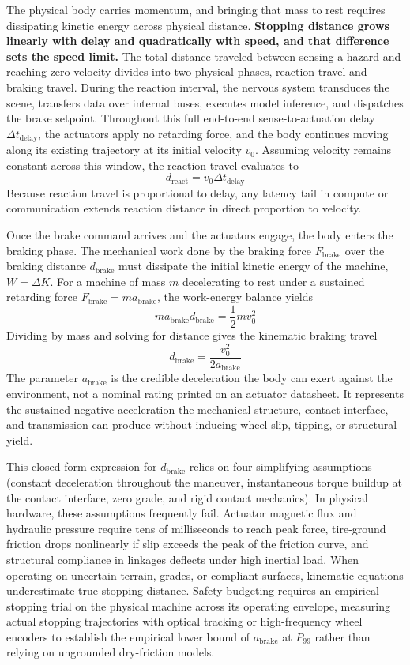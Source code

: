\documentclass[
  letterpaper,
  DIV=11,
  numbers=noendperiod]{scrartcl}
\begin{document}
The physical body carries momentum, and bringing that mass to rest
requires dissipating kinetic energy across physical distance.
\textbf{Stopping distance grows linearly with delay and quadratically
with speed, and that difference sets the speed limit.} The total
distance traveled between sensing a hazard and reaching zero velocity
divides into two physical phases, reaction travel and braking travel.
During the reaction interval, the nervous system transduces the scene,
transfers data over internal buses, executes model inference, and
dispatches the brake setpoint. Throughout this full end-to-end
sense-to-actuation delay \(\Delta t_{\text{delay}}\), the actuators
apply no retarding force, and the body continues moving along its
existing trajectory at its initial velocity \(v_0\). Assuming velocity
remains constant across this window, the reaction travel evaluates to
\[d_{\text{react}} = v_0 \Delta t_{\text{delay}}\] Because reaction
travel is proportional to delay, any latency tail in compute or
communication extends reaction distance in direct proportion to
velocity.

Once the brake command arrives and the actuators engage, the body enters
the braking phase. The mechanical work done by the braking force
\(F_{\text{brake}}\) over the braking distance \(d_{\text{brake}}\) must
dissipate the initial kinetic energy of the machine, \(W = \Delta K\).
For a machine of mass \(m\) decelerating to rest under a sustained
retarding force \(F_{\text{brake}} = m a_{\text{brake}}\), the
work-energy balance yields
\[m a_{\text{brake}} d_{\text{brake}} = \frac{1}{2} m v_0^2\] Dividing
by mass and solving for distance gives the kinematic braking travel
\[d_{\text{brake}} = \frac{v_0^2}{2 a_{\text{brake}}}\] The parameter
\(a_{\text{brake}}\) is the credible deceleration the body can exert
against the environment, not a nominal rating printed on an actuator
datasheet. It represents the sustained negative acceleration the
mechanical structure, contact interface, and transmission can produce
without inducing wheel slip, tipping, or structural yield.

This closed-form expression for \(d_{\text{brake}}\) relies on four
simplifying assumptions (constant deceleration throughout the maneuver,
instantaneous torque buildup at the contact interface, zero grade, and
rigid contact mechanics). In physical hardware, these assumptions
frequently fail. Actuator magnetic flux and hydraulic pressure require
tens of milliseconds to reach peak force, tire-ground friction drops
nonlinearly if slip exceeds the peak of the friction curve, and
structural compliance in linkages deflects under high inertial load.
When operating on uncertain terrain, grades, or compliant surfaces,
kinematic equations underestimate true stopping distance. Safety
budgeting requires an empirical stopping trial on the physical machine
across its operating envelope, measuring actual stopping trajectories
with optical tracking or high-frequency wheel encoders to establish the
empirical lower bound of \(a_{\text{brake}}\) at \(P_{99}\) rather than
relying on ungrounded dry-friction models.
\end{document}
